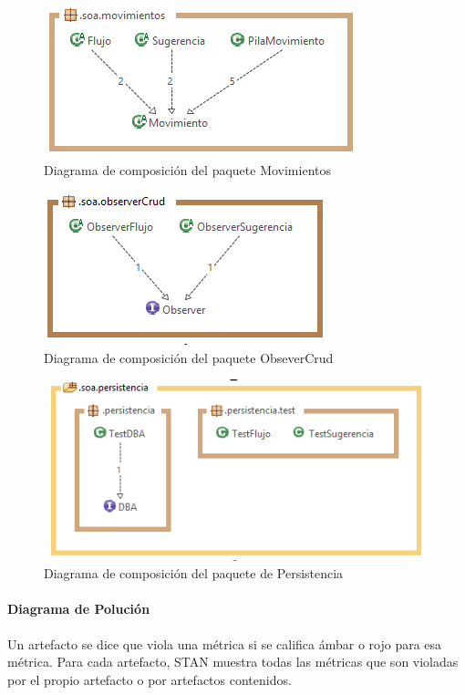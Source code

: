 \begin{figure}[H]
	\centering
	\includegraphics[width=0.7\linewidth]{parte2/imgs/Metricas/SoaMovimientos}
	\caption{Diagrama de composición del paquete Movimientos}
	\label{fig:soamovimientos}
\end{figure}

\begin{figure}[H]
	\centering
	\includegraphics[width=0.5\linewidth]{parte2/imgs/Metricas/SoaObserverCrud}
	\caption{Diagrama de composición del paquete ObseverCrud}
	\label{fig:soaobservercrud}
\end{figure}

\begin{figure}[H]
	\centering
	\includegraphics[width=0.7\linewidth]{parte2/imgs/Metricas/SoaPersistencia}
	\caption{Diagrama de composición del paquete de Persistencia}
	\label{fig:soapersistencia}
\end{figure}

\paragraph{Diagrama de Polución}

Un artefacto se dice que viola una métrica si se califica ámbar o rojo para esa métrica. Para cada artefacto, STAN muestra todas las métricas que son violadas por el propio artefacto o por artefactos contenidos.

